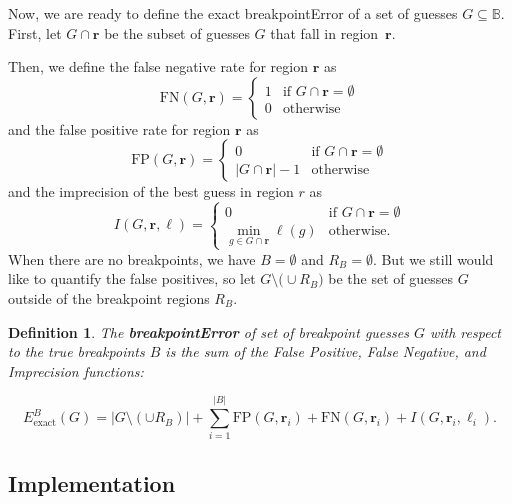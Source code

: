 \documentclass{article}
\newtheorem{definition}{Definition}
\renewcommand{\r}{ \mathbf{ r} }
\begin{document}
Now, we are ready to define the exact breakpointError of a set of
guesses $G\subseteq\mathbb B$.
First, let $G \cap\r$ be the subset of guesses $G$ that fall in
region~$\r$. 

Then, we define the false negative rate for region $\r$ as 
\begin{equation}
  \label{eq:FN_i}
  \text{FN}(G,\r) = 
  \begin{cases}
    1 & \text{if } G\cap\r = \emptyset\\
    0 & \text{otherwise}
  \end{cases}
\end{equation}
and the false positive rate for region $\r$ as
\begin{equation}
  \label{eq:FP_i}
  \text{FP}(G,\r) =
  \begin{cases}
    0 & \text{if }G\cap\r = \emptyset\\
    |G\cap\r|-1 &\text{otherwise}
  \end{cases}
\end{equation}
and the imprecision of the best guess in region $r$ as
\begin{equation}
  \label{eq:imprecision}
  I(G,\r,\ell) =
  \begin{cases}
    0 & \text{if } G\cap\r = \emptyset\\
    \min_{g\in G\cap\r} \ell(g) & \text{otherwise}.
  \end{cases}
\end{equation}
When there are no breakpoints, we have $B=\emptyset$ and
$R_B=\emptyset$. But we still would like to quantify the false
positives, so let $G\setminus\big( \cup R_B\big) $ be the set of
guesses $G$ outside of the breakpoint regions $R_B$. 

\begin{definition}
  \label{def:exact_breakpoint_cost}
  The \textbf{breakpointError} of set of breakpoint guesses $G$ with
  respect to the true breakpoints $B$ is the sum of the False
  Positive, False Negative, and Imprecision functions:

\begin{equation*}
  {E }_{\text{exact}}^B(G) =
  \big|G\setminus(\cup R_B)\big|
 + \sum_{i=1}^{|B|}\textrm{FP}(G,\r_i)+\textrm{FN}(G,\r_i)+I(G,\r_i,\ell_i).
\end{equation*}
\end{definition}

\subsection{Implementation}
\end{document}
